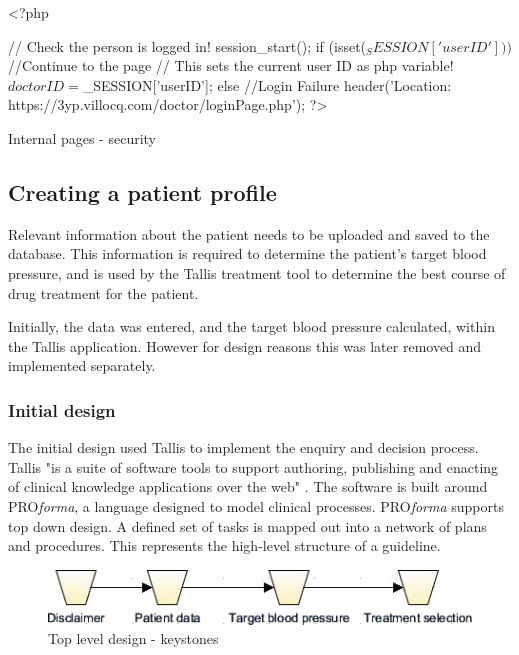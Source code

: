 \documentclass[11pt]{article}
\begin{document}
\begin{code}[ht]
\begin{php}
<?php

// Check the person is logged in!
session_start();    
if (isset($_SESSION['userID'])) $
{
    //Continue to the page
    // This sets the current user ID as php variable!
    $doctorID = $_SESSION['userID'];
}
else
{
    //Login Failure
header('Location: https://3yp.villocq.com/doctor/loginPage.php'); 
}
?>
\end{php}
\caption{Internal pages - security}
\label{code:intPages}
\end{code}


\subsection{Creating a patient profile}

Relevant information about the patient needs to be uploaded and saved to the database. This information is required to determine the patient's target blood pressure, and is used by the Tallis treatment tool to determine the best course of drug treatment for the patient.

Initially, the data was entered, and the target blood pressure calculated, within the Tallis application. However for design reasons this was later removed and implemented separately.

\subsubsection{Initial design}

The initial design used Tallis to implement the enquiry and decision process. Tallis "is a suite of software tools to support authoring, publishing and enacting of clinical knowledge applications over the web" \cite{tallisDescription}. The software is built around PRO\textit{forma}, a language designed to model clinical processes. PRO\textit{forma} supports top down design. A defined set of tasks is mapped out into a network of plans and procedures. This represents the high-level structure of a guideline. 

\begin{figure}[ht]
\begin{center}
\includegraphics[scale=0.8]{tallis_keystone_top}
\caption{Top level design - keystones}
\label{fig:tallis_keystone_top}
\end{center}
\end{figure}
\end{document}
